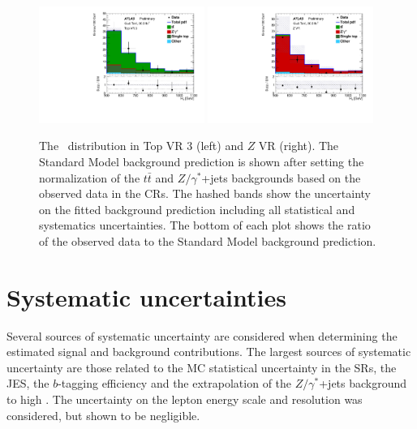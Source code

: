 \begin{figure}
  \centering
  \includegraphics[width=0.48\textwidth]{figs/blstop/vr_top_3_ht_signal.pdf}
  \includegraphics[width=0.48\textwidth]{figs/blstop/vr_Z_ht_signal.pdf}
  \caption{The \HT\ distribution in Top VR 3 (left)
    and $Z$ VR (right). The Standard Model background prediction is shown
    after setting the normalization of the $t\bar{t}$ and $Z/\gamma^{*}$+jets
    backgrounds based on the observed data in the CRs. The hashed bands show
    the uncertainty on the fitted background prediction including
    all statistical and systematics uncertainties.
    The bottom of each plot shows the ratio of the observed data to the
    Standard Model background prediction.
  }
  \label{fig:ht_vr}
\end{figure}

\section{Systematic uncertainties}
\label{sec:systematics}

Several sources of systematic uncertainty are considered when determining
the estimated signal and background contributions.
The largest sources of systematic uncertainty are those related to the
MC statistical uncertainty in the SRs, the JES, the $b$-tagging efficiency
and the extrapolation of the $Z/\gamma^{*}$+jets background to high \HT. 
The uncertainty on the lepton energy scale and resolution was considered,
but shown to be negligible.

